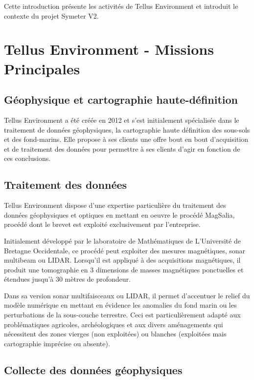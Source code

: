 \documentclass[12pt,a4paper]{report}
\begin{document}
\para Cette introduction présente les activités de Tellus Environment et introduit le contexte du projet Symeter V2. 

	\section{Tellus Environment - Missions Principales}

	\subsection{Géophysique et cartographie haute-définition}
	Tellus Environment a été créée en 2012 et s'est initialement spécialisée dans le traitement de données géophysiques, la cartographie haute définition des sous-sols et des fond-marins. Elle propose à ses clients une offre bout en bout d'acquisition et de traitement des données pour permettre à ses clients d'agir en fonction de ces conclusions.
	
	\subsection{Traitement des données}
	Tellus Environment dispose d'une expertise particulière du traitement des données géophysiques et optiques en mettant en oeuvre le procédé MagSalia, procédé dont le brevet est exploité exclusivement par l'entreprise.
	
	\para Initialement développé par le laboratoire de Mathématiques de L'Université de Bretagne Occidentale, ce procédé peut exploiter des mesures magnétiques, sonar multibeam ou LIDAR. Lorsqu'il est appliqué à des acquisitions magnétiques, il produit une tomographie en 3 dimensions de masses magnétiques ponctuelles et étendues jusqu'à 30 mètres de profondeur.
	
	\para Dans sa version sonar multifaisceaux ou LIDAR, il permet d'accentuer le relief du modèle numérique en mettant en évidence les anomalies du fond marin ou les perturbations de la sous-couche terrestre. Ceci est particulièrement adapté aux problématiques agricoles, archéologiques et aux divers aménagements qui nécessitent des zones vierges (non exploitées) ou blanches (exploitées mais cartographie imprécise ou absente).
	
	\subsection{Collecte des données géophysiques}
	
\end{document}
